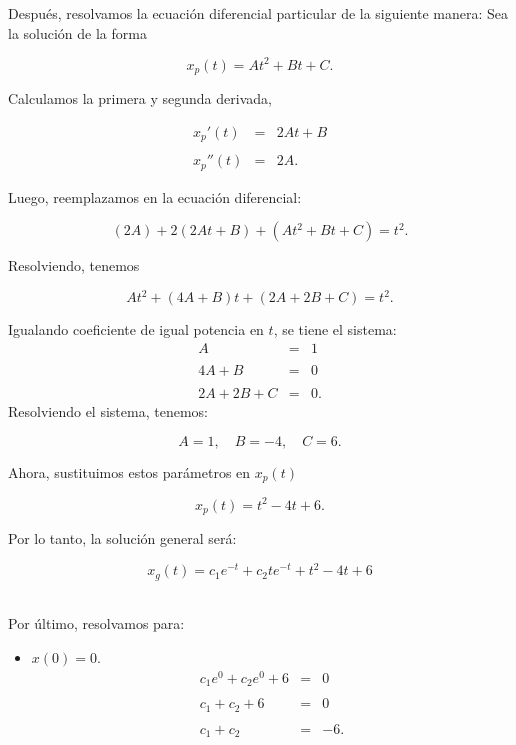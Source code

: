 \begin{enumerate}
\begin{multicols}{2}
	Después, resolvamos la ecuación diferencial particular de la siguiente manera: Sea la solución de la forma 

	$$x_p(t)=At^2+Bt+C.$$
	
	Calculamos la primera y segunda derivada,

	$$
	\begin{array}{rcl}
	    x_p'(t)&=&2At+B\\\\
	    x_p''(t)&=&2A.
	\end{array}
	$$

	Luego, reemplazamos en la ecuación diferencial:

	$$\left(2A\right)+2(2At+B)+\left(At^2+Bt+C\right)=t^2.$$

	Resolviendo, tenemos

	$$At^2+(4A+B)t+(2A+2B+C)=t^2.$$

	Igualando coeficiente de igual potencia en $t$, se tiene el sistema:
	$$
	\begin{array}{rcl}
	    A&=&1\\\\
	    4A+B&=&0\\\\
	    2A+2B+C&=&0.
	\end{array}
	$$
	Resolviendo el sistema, tenemos:
	\begin{tcolorbox}
	    $$A=1,\quad B=-4,\quad C=6.$$
	\end{tcolorbox}

	Ahora, sustituimos estos parámetros en $x_p(t)$
	\begin{tcolorbox}
	    $$x_p(t)=t^2-4t+6.$$
	\end{tcolorbox}

	Por lo tanto, la solución general será:

	\begin{tcolorbox}
	    $$x_g(t)=c_1e^{-t}+c_2te^{-t}+ t^2-4t+6$$\\
	\end{tcolorbox}

	Por último, resolvamos para: 
	\begin{itemize}
	    \item $x(0)=0$.
		$$
		\begin{array}{rcr}
		    c_1e^{0}+c_2e^{0}+6&=&0\\\\
		    c_1+c_2+6&=&0\\\\
		    c_1+c_2&=&-6.
		\end{array}
		$$


\end{itemize}
\end{multicols}
\end{enumerate}
